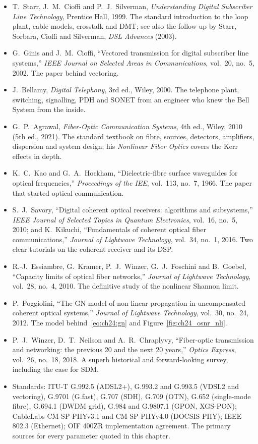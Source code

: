 \furtherreading
\begin{itemize}
\item T.~Starr, J.~M.~Cioffi and P.~J.~Silverman, \emph{Understanding Digital Subscriber Line Technology},
Prentice Hall, 1999. The standard introduction to the loop plant, cable models, crosstalk and DMT; see also
the follow-up by Starr, Sorbara, Cioffi and Silverman, \emph{DSL Advances} (2003).
\item G.~Ginis and J.~M.~Cioffi, ``Vectored transmission for digital subscriber line systems,'' \emph{IEEE
Journal on Selected Areas in Communications}, vol.~20, no.~5, 2002. The paper behind vectoring.
\item J.~Bellamy, \emph{Digital Telephony}, 3rd ed., Wiley, 2000. The telephone plant, switching,
signalling, PDH and SONET from an engineer who knew the Bell System from the inside.
\item G.~P.~Agrawal, \emph{Fiber-Optic Communication Systems}, 4th ed., Wiley, 2010 (5th ed., 2021). The
standard textbook on fibre, sources, detectors, amplifiers, dispersion and system design; his
\emph{Nonlinear Fiber Optics} covers the Kerr effects in depth.
\item K.~C.~Kao and G.~A.~Hockham, ``Dielectric-fibre surface waveguides for optical frequencies,''
\emph{Proceedings of the IEE}, vol.~113, no.~7, 1966. The paper that started optical communication.
\item S.~J.~Savory, ``Digital coherent optical receivers: algorithms and subsystems,'' \emph{IEEE Journal of
Selected Topics in Quantum Electronics}, vol.~16, no.~5, 2010; and K.~Kikuchi, ``Fundamentals of coherent
optical fiber communications,'' \emph{Journal of Lightwave Technology}, vol.~34, no.~1, 2016. Two clear
tutorials on the coherent receiver and its DSP.
\item R.-J.~Essiambre, G.~Kramer, P.~J.~Winzer, G.~J.~Foschini and B.~Goebel, ``Capacity limits of optical
fiber networks,'' \emph{Journal of Lightwave Technology}, vol.~28, no.~4, 2010. The definitive study of the
nonlinear Shannon limit.
\item P.~Poggiolini, ``The GN model of non-linear propagation in uncompensated coherent optical systems,''
\emph{Journal of Lightwave Technology}, vol.~30, no.~24, 2012. The model behind~\eqref{eq:ch24:gn} and
Figure~\ref{fig:ch24_osnr_nli}.
\item P.~J.~Winzer, D.~T.~Neilson and A.~R.~Chraplyvy, ``Fiber-optic transmission and networking: the
previous 20 and the next 20 years,'' \emph{Optics Express}, vol.~26, no.~18, 2018. A superb historical and
forward-looking survey, including the case for SDM.
\item Standards: ITU-T G.992.5 (ADSL2+), G.993.2 and G.993.5 (VDSL2 and vectoring), G.9701 (G.fast), G.707
(SDH), G.709 (OTN), G.652 (single-mode fibre), G.694.1 (DWDM grid), G.984 and G.9807.1 (GPON, XGS-PON);
CableLabs CM-SP-PHYv3.1 and CM-SP-PHYv4.0 (DOCSIS PHY); IEEE 802.3 (Ethernet); OIF 400ZR implementation
agreement. The primary sources for every parameter quoted in this chapter.
\end{itemize}
